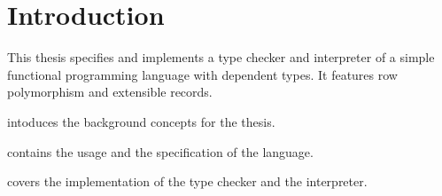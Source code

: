 \chapter{Introduction}\label{ch:introduction}

This thesis specifies and implements a type checker and interpreter of a simple
functional programming language with dependent types. It features row
polymorphism and extensible records.

 intoduces the background concepts for the thesis.

 contains the usage and the specification of the language.

 covers the implementation of the type checker and the
interpreter.
